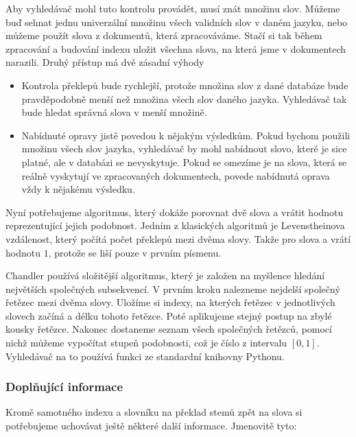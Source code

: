 \documentclass[12pt]{article}
\newcommand{\name}{Chandler}
\newcommand{\sssection}[1]{\subsubsection{#1}}
\begin{document}
Aby vyhledávač mohl tuto kontrolu provádět, musí znát množinu  slov. Můžeme buď sehnat jednu univerzální množinu všech validních slov v daném jazyku, nebo můžeme použít slova z dokumentů, která zpracováváme. Stačí si tak během zpracování a budování indexu uložit všechna slova, na která jsme v dokumentech narazili. Druhý přístup má dvě zásadní výhody

\begin{itemize}
	\item Kontrola překlepů bude rychlejší, protože množina slov z dané databáze bude pravděpodobně menší než množina všech slov daného jazyka. Vyhledávač tak bude hledat správná slova v menší množině. 
	\item Nabídnuté opravy jistě povedou k nějakým výsledkům. Pokud bychom použili množinu všech slov jazyka, vyhledávač by mohl nabídnout slovo, které je sice platné, ale v databázi se nevyskytuje. Pokud se omezíme je na slova, která se reálně vyskytují ve zpracovaných dokumentech, povede nabídnutá oprava vždy k nějakému výsledku.
\end{itemize}

Nyní potřebujeme algoritmus, který dokáže porovnat dvě slova a vrátit hodnotu reprezentující jejich podobnost. Jedním z klasických algoritmů je Levenstheinova vzdálenost, který počítá počet překlepů mezi dvěma slovy. Takže pro slova  a  vrátí hodnotu $1$, protože se liší pouze v prvním písmenu. 

\name{} používá složitější algoritmus, který je založen na myšlence hledání největších společných subsekvencí. V prvním kroku nalezneme nejdelší společný řetězec mezi dvěma slovy. Uložíme si indexy, na kterých řetězec v jednotlivých slovech začíná a délku tohoto řetězce. Poté aplikujeme stejný postup na zbylé kousky řetězce. Nakonec dostaneme seznam všech společných řetězců, pomocí nichž můžeme vypočítat stupeň podobnosti, což je číslo z intervalu $[0, 1]$. Vyhledávač na to používá funkci ze standardní knihovny Pythonu. 



\sssection{Doplňující informace}
Kromě samotného indexu a slovníku na překlad stemů zpět na slova si potřebujeme uchovávat ještě některé další informace. Jmenovitě tyto: 
\end{document}
